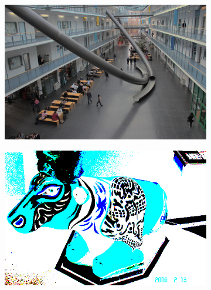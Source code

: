 \documentclass[journal, a4paper]{IEEEtran}
\begin{document}
\begin{figure}[h]
    \begin{subfigure}{.25\textwidth}
      \centering
      \includegraphics[width=.8\linewidth]{../data/IMG_3}
      \caption{}
      \label{fig:c}
    \end{subfigure}%
    \begin{subfigure}{.25\textwidth}
      \centering
      \includegraphics[width=.8\linewidth]{../data/IMG_4}
      \caption{}
      \label{fig:d}
    \end{subfigure}


\end{figure}
\end{document}
